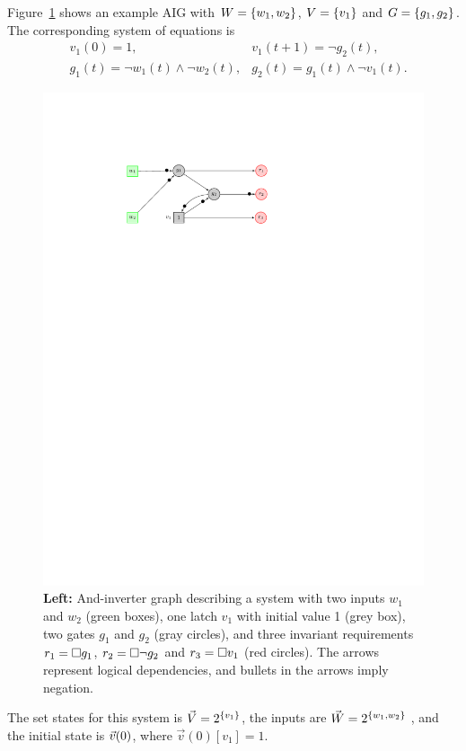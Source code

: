 \begin{example}
\label{ex:simple}
Figure~\ref{fig:Preliminaries:AIGExample} shows an example AIG with $W=\left\{w_1,w_2\right\}$, $V=\left\{v_1\right\}$ and $G=\left\{g_1,g_2\right\}$. The corresponding system of equations is
\begin{align*}
&v_1(0)=1, & v_1(t+1)=\lnot g_2(t),\\
&g_1(t)=\lnot w_1(t) \land \lnot w_2(t), & g_2(t)=g_1(t) \land \lnot v_1(t).
\end{align*}
\begin{figure}[!t]
\begin{framed}
\includegraphics[width=\textwidth]{Example.pdf}
\end{framed}
\caption{\textbf{Left:} And-inverter graph describing a system with two
inputs $w_1$ and $w_2$ (green boxes), one latch $v_1$ with initial value 1 (grey box), two gates $g_1$ and $g_2$ (gray circles), and three invariant requirements $r_1={{\square}} g_1$, $r_2={{\square}} \lnot g_2$ and $r_3={{\square}} v_1$ (red circles). 
The arrows represent logical dependencies, and bullets in the arrows imply negation.}
\label{fig:Preliminaries:AIGExample}
\end{figure}
The set states for this system is $\vec{V}=2^{\left\{v_1\right\}}$, the inputs are $\vec{W}=2^{\left\{w_1,w_2\right\}}$
, and the initial state is $\vec{v}(0)$, where $\vec{v}(0)[v_1]=1$.


\end{example}
